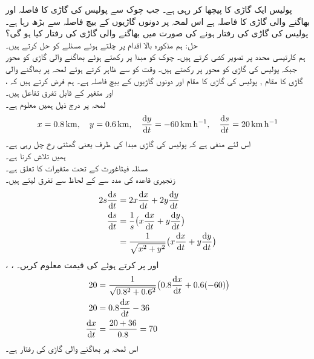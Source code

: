 %
پولیس ایک گاڑی کا پیچھا کر رہی ہے۔ جب چوک سے پولیس کی گاڑی کا فاصلہ  اور  بھاگنے والی گاڑی کا فاصلہ  ہے  اس لمحہ پر دونوں گاڑیوں کے بیچ فاصلہ  سے بڑھ رہا ہے۔پولیس کی گاڑی کی رفتار  ہونے کی صورت میں بھاگنے والی گاڑی کی رفتار کیا ہو گی؟\\
حل:\quad
ہم مذکورہ بالا اقدام پر چلتے ہوئے مسئلے کو حل کرتے ہیں۔\\
\quad
{} ہم کارتیسی محدد پر تصویر کشی کرتے ہیں۔ چوک کو مبدا پر رکھتے ہوئے بھاگنے والی گاڑی کو  محور جبکہ پولیس کی گاڑی کو  محور پر رکھتے ہیں۔ وقت کو  سے ظاہر کرتے ہوئے لمحہ  پر بھاگنے والی گاڑی کا مقام , پولیس کی گاڑی کا مقام  اور دونوں گاڑیوں کے بیچ فاصلہ  ہے۔ ہم فرض کرتے ہیں کہ ،  اور  متغیر  کے قابل تفرق تفاعل ہیں۔\\
\quad
{} لمحہ  پر درج ذیل ہمیں معلوم ہے۔
\begin{align*}
x=\SI{0.8}{\kilo\meter},\quad y=\SI{0.6}{\kilo\meter},\quad \frac{\dif y}{\dif t}=\SI{-60}{\kilo\meter\per\hour},\quad \frac{\dif s}{\dif t}=\SI{20}{\kilo\meter\per\hour}
\end{align*}  
 اس لئے منفی ہے کہ پولیس کی گاڑی مبدا کی طرف یعنی گھٹتی   رخ چل رہی ہے۔\\
\quad
ہمیں  تلاش کرنا ہے۔\\
\quad
مسئلہ فیثاغورث کے تحت متغیرات کا تعلق  ہے۔\\
\quad
زنجیری قاعدہ کی مدد سے  کے لحاظ سے تفرق لیتے ہیں۔
\begin{align*}
2s\frac{\dif s}{\dif t}&=2x\frac{\dif x}{\dif t}+2y\frac{\dif y}{\dif t}\\
\frac{\dif s}{\dif t}&=\frac{1}{s}\big(x\frac{\dif x}{\dif t}+y\frac{\dif y}{\dif t}\big)\\
&=\frac{1}{\sqrt{x^2+y^2}}\big(x\frac{\dif x}{\dif t}+y\frac{\dif y}{\dif t}\big)
\end{align*}
\quad
{}، ،  اور  پر کرتے ہوئے  کی قیمت معلوم کریں۔
\begin{align*}
20&=\frac{1}{\sqrt{0.8^2+0.6^2}}\big(0.8\frac{\dif x}{\dif t}+0.6(-60)\big)\\
20&=0.8\frac{\dif x}{\dif t}-36\\
\frac{\dif x}{\dif t}&=\frac{20+36}{0.8}=70
\end{align*}
اس لمحہ پر بھاگنے والی گاڑی کی رفتار  ہے۔ 

